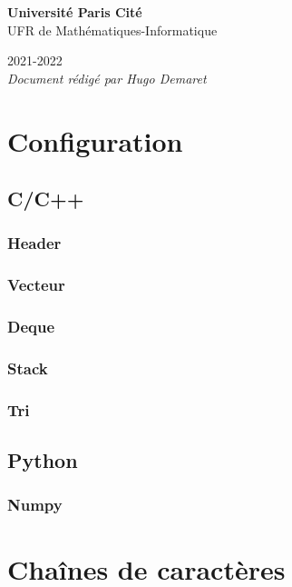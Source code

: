 \documentclass[8pt]{article}
\begin{document}
\begin{titlepage}
\begin{center}
        \textbf{Université Paris Cité}\\
        UFR de Mathématiques-Informatique

        2021-2022\\
        \textit{Document rédigé par Hugo Demaret}
    \end{center}
\end{titlepage}
    \section{Configuration}
        \subsection{C/C++}
            \subsubsection{Header}
            {\scriptsize}
            \subsubsection{Vecteur}
            {\scriptsize}
            \subsubsection{Deque}
            {\scriptsize}
            \subsubsection{Stack}
            {\scriptsize}
            \subsubsection{Tri}
            {\scriptsize}
        \subsection{Python}
            \subsubsection{Numpy}
            {\scriptsize}
    \section{Chaînes de caractères}
\end{document}
